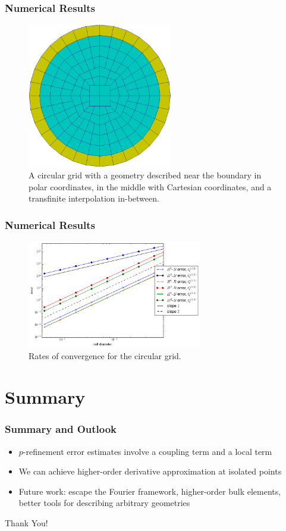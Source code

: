 \documentclass[8pt]{beamer}
\begin{document}
\begin{frame}
    \frametitle{Numerical Results}
    \begin{figure}
        \centering

        \includegraphics[width=2.5in]{Pictures/circular-grid.png}
        \caption{A circular grid with a geometry described near the boundary in
        polar coordinates, in the middle with Cartesian coordinates, and a
        transfinite interpolation in-between.}
    \end{figure}
\end{frame}

\begin{frame}
    \frametitle{Numerical Results}
    \begin{figure}
        \centering

        \includegraphics[width=3in]{Pictures/circle-nonnormal-convergence.png}
        \caption{Rates of convergence for the circular grid.}
    \end{figure}
\end{frame}

\section{Summary}
\begin{frame}
    \frametitle{Summary and Outlook}
    \begin{itemize}
        \item \(p\)-refinement error estimates involve a coupling term and a
              local term
        \item We can achieve higher-order derivative approximation at isolated
              points
        \item Future work: escape the Fourier framework, higher-order bulk
              elements, better tools for describing arbitrary geometries
    \end{itemize}

    \vspace{0.5in}
    \begin{center}
        \textcolor{RPIred}{\Huge Thank You!}
    \end{center}
\end{frame}
\end{document}
